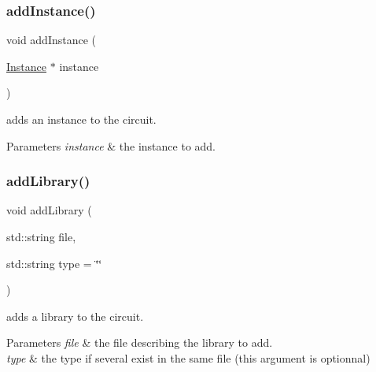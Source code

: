 \subsubsection{\texorpdfstring{add\+Instance()}{addInstance()}}
{\footnotesize\ttfamily void add\+Instance (\begin{DoxyParamCaption}\item[{\mbox{\hyperlink{class_s_p_i_c_e_1_1_instance}{Instance}} $\ast$}]{instance }\end{DoxyParamCaption})\hspace{0.3cm}{\ttfamily [inline]}}



adds an instance to the circuit. 


\begin{DoxyParams}{Parameters}
{\em instance} & the instance to add. \\
\hline
\end{DoxyParams}
\mbox{\label{class_s_p_i_c_e_1_1_circuit_a49939060cc1cb8e4bfaf003025032096}} 
\subsubsection{\texorpdfstring{add\+Library()}{addLibrary()}}
{\footnotesize\ttfamily void add\+Library (\begin{DoxyParamCaption}\item[{std\+::string}]{file,  }\item[{std\+::string}]{type = {\ttfamily \char`\"{}\char`\"{}} }\end{DoxyParamCaption})\hspace{0.3cm}{\ttfamily [inline]}}



adds a library to the circuit. 


\begin{DoxyParams}{Parameters}
{\em file} & the file describing the library to add. \\
\hline
{\em type} & the type if several exist in the same file (this argument is optionnal) \\
\hline
\end{DoxyParams}
\mbox{\label{class_s_p_i_c_e_1_1_circuit_a1abe34b48e2b6e1834a143fdef159cb9}} 
